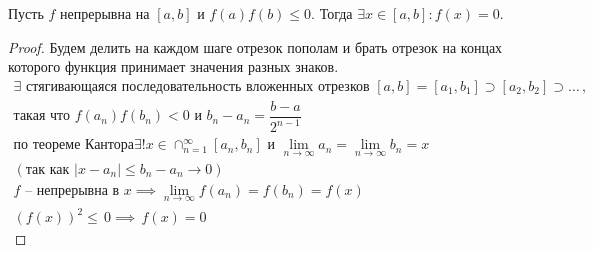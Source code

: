 \begin{theorem} \label{IntermediateValueV1}
	Пусть $ f $ непрерывна на $ [a, b] $ и $ f(a)f(b) \leq  0 $. Тогда $ \exists  x \in [a, b]: f(x) = 0 $.
\end{theorem} \begin{proof}
	Будем делить на каждом шаге отрезок пополам и брать отрезок на концах которого функция принимает значения разных знаков. \begin{gather}
		\exists \text{ стягивающаяся последовательность вложенных отрезков } [a, b] = [a_1, b_1] \supset [a_2, b_2] \supset \dots\,, \\
		 \text{такая что } f(a_n)f(b_n) < 0 \text{ и } b_n - a_n = \dfrac{b - a}{2^{n - 1}}\, \\
		\text{по теореме Кантора} \exists! x \in \cap_{n = 1}^\infty[a_n, b_n] \text{ и } \lim_{n \to  \infty}a_n = \lim_{n \to \infty}b_n = x \\
		(\text{так как } |x - a_n| \leq b_n - a_n \to 0) \\
		f \text{ -- непрерывна в } x \implies \lim_{n \to \infty}f( a_n) = f( b_n) = f(x) \\
		\left(f(x)\right)^2 \leq\, 0 \implies\, f(x) = 0
	\end{gather}
\end{proof}

